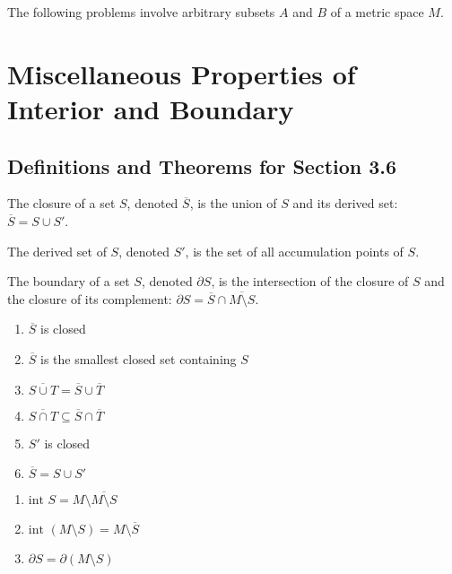 \begin{problembox}
The following problems involve arbitrary subsets \( A \) and \( B \) of a metric space \( M \).
\end{problembox}

\section{Miscellaneous Properties of Interior and Boundary}

\subsection*{Definitions and Theorems for Section 3.6}

\begin{definition}[Closure]
The closure of a set $S$, denoted $\overline{S}$, is the union of $S$ and its derived set: $\overline{S} = S \cup S'$.
\end{definition}

\begin{definition}
The derived set of $S$, denoted $S'$, is the set of all accumulation points of $S$.
\end{definition}

\begin{definition}[Boundary]
The boundary of a set $S$, denoted $\partial S$, is the intersection of the closure of $S$ and the closure of its complement: $\partial S = \overline{S} \cap \overline{M \setminus S}$.
\end{definition}

\begin{theorem}
\begin{enumerate}
\item $\overline{S}$ is closed
\item $\overline{S}$ is the smallest closed set containing $S$
\item $\overline{S \cup T} = \overline{S} \cup \overline{T}$
\item $\overline{S \cap T} \subseteq \overline{S} \cap \overline{T}$
\item $S'$ is closed
\item $\overline{S} = S \cup S'$
\end{enumerate}
\end{theorem}

\begin{theorem}
\begin{enumerate}
\item $\text{int } S = M \setminus \overline{M \setminus S}$
\item $\text{int }(M \setminus S) = M \setminus \overline{S}$
\item $\partial S = \partial(M \setminus S)$
\end{enumerate}
\end{theorem}

